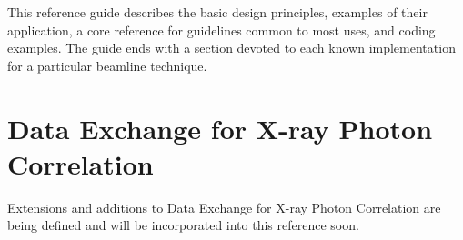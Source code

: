 \documentclass[usletter,11pt]{article}
\begin{document}
This reference guide describes the basic design principles, examples of their
application, a core reference for guidelines common to most uses, and coding
examples. The guide ends with a section devoted to each known implementation
for a particular beamline technique.



\newpage



\newpage



\newpage



\newpage




\section{Data Exchange for X-ray Photon Correlation}

Extensions and additions to Data Exchange for X-ray Photon Correlation are being
defined and will be incorporated into this reference soon.


\end{document}
